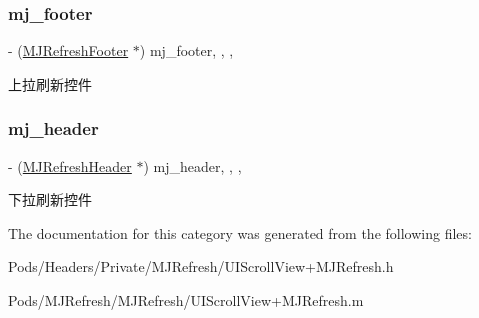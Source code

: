 \subsubsection{\texorpdfstring{mj\+\_\+footer}{mj\_footer}}
{\footnotesize\ttfamily -\/ (\mbox{\hyperlink{interface_m_j_refresh_footer}{M\+J\+Refresh\+Footer}} $\ast$) mj\+\_\+footer\hspace{0.3cm}{\ttfamily [read]}, {\ttfamily [write]}, {\ttfamily [nonatomic]}, {\ttfamily [strong]}}

上拉刷新控件 \mbox{\label{category_u_i_scroll_view_07_m_j_refresh_08_a19fea60be0ddae15a33c3c3b283c17be}} 
\subsubsection{\texorpdfstring{mj\+\_\+header}{mj\_header}}
{\footnotesize\ttfamily -\/ (\mbox{\hyperlink{interface_m_j_refresh_header}{M\+J\+Refresh\+Header}} $\ast$) mj\+\_\+header\hspace{0.3cm}{\ttfamily [read]}, {\ttfamily [write]}, {\ttfamily [nonatomic]}, {\ttfamily [strong]}}

下拉刷新控件 

The documentation for this category was generated from the following files\+:\begin{DoxyCompactItemize}
\item 
Pods/\+Headers/\+Private/\+M\+J\+Refresh/U\+I\+Scroll\+View+\+M\+J\+Refresh.\+h\item 
Pods/\+M\+J\+Refresh/\+M\+J\+Refresh/U\+I\+Scroll\+View+\+M\+J\+Refresh.\+m\end{DoxyCompactItemize}
